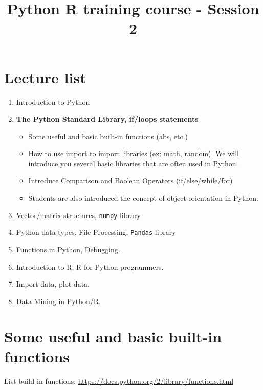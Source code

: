 \documentclass[11pt]{article}
\title{Python R training course - Session 2}
\providecommand{\tightlist}{%
      \setlength{\itemsep}{0pt}\setlength{\parskip}{0pt}}
\begin{document}
    
    
    \maketitle
    
    

    
    \section{Lecture list}\label{lecture-list}

\begin{enumerate}
\def\labelenumi{\arabic{enumi}.}
\item
  Introduction to Python
\item
  \textbf{The Python Standard Library, if/loops statements}

  \begin{itemize}
  \tightlist
  \item
    Some useful and basic built-in functions (abs, etc.)
  \item
    How to use import to import libraries (ex: math, random). We will
    introduce you several basic libraries that are often used in Python.
  \item
    Introduce Comparison and Boolean Operators (if/else/while/for)
  \item
    Students are also introduced the concept of object-orientation in
    Python.
  \end{itemize}
\item
  Vector/matrix structures, \texttt{numpy} library
\item
  Python data types, File Processing, \texttt{Pandas} library
\item
  Functions in Python, Debugging.
\item
  Introduction to R, R for Python programmers.
\item
  Import data, plot data.
\item
  Data Mining in Python/R.
\end{enumerate}

    \section{Some useful and basic built-in
functions}\label{some-useful-and-basic-built-in-functions}

List build-in functions:
\url{https://docs.python.org/2/library/functions.html}
\end{document}
